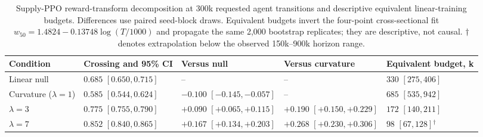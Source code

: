 \begin{table}[t]
\caption{Supply-PPO reward-transform decomposition at 300k requested agent transitions and descriptive equivalent linear-training budgets. Differences use paired seed-block draws. Equivalent budgets invert the four-point cross-sectional fit $w_{50}=1.4824-0.13748\log(T/1000)$ and propagate the same 2,000 bootstrap replicates; they are descriptive, not causal. $\dagger$ denotes extrapolation below the observed 150k--900k horizon range.}
\label{tab:decomposition}
\centering\small
{\setlength{\tabcolsep}{4pt}
\begin{tabular}{@{}lllll@{}}
\toprule
Condition & Crossing and 95\% CI & Versus null & Versus curvature & Equivalent budget, k \\
\midrule
Linear null & $0.685$ $[0.650,0.715]$ & -- & -- & $330$ $[275,406]$ \\
Curvature ($\lambda=1$) & $0.585$ $[0.544,0.624]$ & $-0.100$ $[-0.145,-0.057]$ & -- & $685$ $[535,942]$ \\
$\lambda=3$ & $0.775$ $[0.755,0.790]$ & $+0.090$ $[+0.065,+0.115]$ & $+0.190$ $[+0.150,+0.229]$ & $172$ $[140,211]$ \\
$\lambda=7$ & $0.852$ $[0.840,0.865]$ & $+0.167$ $[+0.134,+0.203]$ & $+0.268$ $[+0.230,+0.306]$ & $98$ $[67,128]$$^{\dagger}$ \\
\bottomrule
\end{tabular}
}
\end{table}
